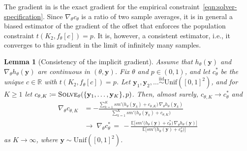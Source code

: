 \documentclass{article}
\theoremstyle{plain}
\newtheorem{lemma}{Lemma}[section]
\theoremstyle{definition}
\theoremstyle{remark}
\newcommand*{\R}{\mathbb{R}}
\begin{document}
The gradient in  is the exact gradient for the empirical constraint~\eqref{eqn:solver-specification}. Since $\nabla_\theta c_\theta$ is a ratio of two sample averages, it is in general a biased estimator of the gradient of the offset that enforces the population constraint $t(K_2, f_\theta[c]) = p$. It is, however, a consistent estimator, i.e., it converges to this gradient in the limit of infinitely many samples.

\begin{lemma}[Consistency of the implicit gradient]\label{lem:consistency}
Assume that $h_\theta(\mathbf{y})$ and $\nabla_\theta h_\theta(\mathbf{y})$ are continuous in $(\theta, \mathbf{y})$. Fix $\theta$ and $p \in (0,1)$, and let $c^*_\theta$ be the unique $c \in \R$ with $t(K_2, f_\theta[c]) = p$. Let $\mathbf{y}_1, \mathbf{y}_2, \ldots \stackrel{\mathrm{iid}}{\sim} \mathrm{Unif}([0,1]^2)$, and for $K \ge 1$ let $c_{\theta,K} \coloneqq \textnormal{\textsc{Solve}}_\theta(\{\mathbf{y}_1, \ldots, \mathbf{y}_K\}, p)$. Then, almost surely, $c_{\theta,K} \to c^*_\theta$ and
\begin{align*}
\nabla_\theta c_{\theta,K}
&= -\frac{\sum_{k=1}^{K} \mathit{sm}'\bigl(h_\theta(\mathbf{y}_k) + c_{\theta,K}\bigr)\, \nabla_\theta h_\theta(\mathbf{y}_k)}{\sum_{k=1}^{K} \mathit{sm}'\bigl(h_\theta(\mathbf{y}_k) + c_{\theta,K}\bigr)}
\\
&\longrightarrow\;
\nabla_\theta c^*_\theta
\,=\, -\frac{\mathbb{E}\bigl[\mathit{sm}'\bigl(h_\theta(\mathbf{y}) + c^*_\theta\bigr)\, \nabla_\theta h_\theta(\mathbf{y})\bigr]}{\mathbb{E}\bigl[\mathit{sm}'\bigl(h_\theta(\mathbf{y}) + c^*_\theta\bigr)\bigr]}
\end{align*}
as $K \to \infty$, where $\mathbf{y} \sim \mathrm{Unif}([0,1]^2)$.
\end{lemma}
\end{document}

